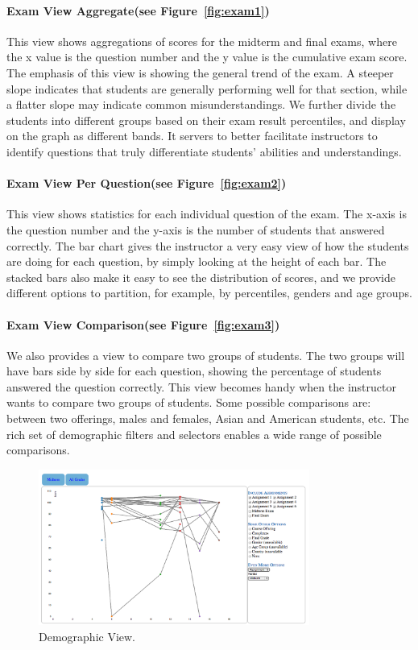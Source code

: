 \paragraph{Exam View Aggregate(see Figure~\ref{fig:exam1})}
This view shows aggregations of scores for the midterm and final exams, where the x value is the question number and the y value is the cumulative exam score. The emphasis of this view is showing the general trend of the exam. A steeper slope indicates that students are generally performing well for that section, while a flatter slope may indicate common misunderstandings. We further divide the students into different groups based on their exam result percentiles, and display on the graph as different bands. It servers to better facilitate instructors to identify questions that truly differentiate students' abilities and understandings.

\paragraph{Exam View Per Question(see Figure~\ref{fig:exam2})}
This view shows statistics for each individual question of the exam. The x-axis is the question number and the y-axis is the number of students that answered correctly. The bar chart gives the instructor a very easy view of how the students are doing for each question, by simply looking at the height of each bar. The stacked bars also make it easy to see the distribution of scores, and we provide different options to partition, for example, by percentiles, genders and age groups.

\paragraph{Exam View Comparison(see Figure~\ref{fig:exam3})}
We also provides a view to compare two groups of students. The two groups will have bars side by side for each question, showing the percentage of students answered the question correctly. This view becomes handy when the instructor wants to compare two groups of students. Some possible comparisons are: between two offerings, males and females, Asian and American students, etc. The rich set of demographic filters and selectors enables a wide range of possible comparisons.

\begin{figure}[htb]
 \centering
 \includegraphics[width=3.5in]{aggregate_stub.png}
 \caption{Demographic View.}
  \label{fig:demo}	
\end{figure}

